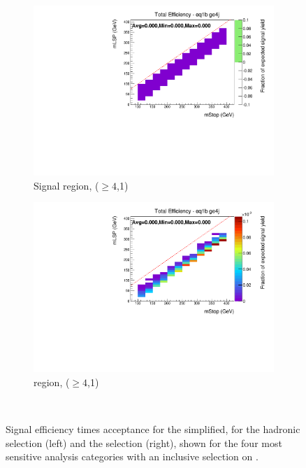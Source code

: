 \begin{figure}[ht!]
\begin{subfigure}[b]{0.47\textwidth}
    \includegraphics[width=\textwidth, trim=0 0 0 24, clip=true]{Figs/sms/t2degen/v5/T2_4body_v5_had_eff_maps_eq1b_ge4j_SITV.pdf}
    \caption{Signal region, ($\geq 4$,1)}
    \label{fig:t2_4body_sig_eff_ge4j_1b}
  \end{subfigure}
  \begin{subfigure}[b]{0.47\textwidth}
    \includegraphics[width=\textwidth, trim=0 0 0 24, clip=true]{Figs/sms/t2degen/v5/T2_4body_v5_muon_eff_maps_eq1b_ge4j_SITV.pdf}
    \caption{\mj region, ($\geq 4$,1)}
    \label{fig:t2_4body_mu_eff_ge4j_1b}
  \end{subfigure} \\
  \caption{Signal efficiency times acceptance for the \Ttwodegen simplified, for 
  the hadronic selection (left) and the \mj selection (right), shown for the 
  four most sensitive analysis categories with an inclusive selection on \HT.}
  \label{fig:t2_4body_eff}
\end{figure}

